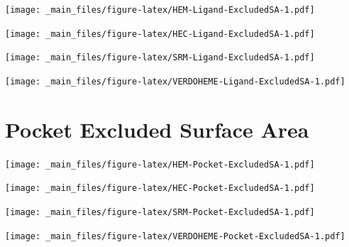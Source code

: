 \documentclass[a4paper, nobind]{templates/ociamthesis}
\let\origfigure\figure
\let\endorigfigure\endfigure
\renewenvironment{figure}[1][2] {
    \expandafter\origfigure\expandafter[H]
} {
    \endorigfigure
}
\begin{document}
\begin{figure}
\centering
\texttt{[image: \_main\_files/figure-latex/HEM-Ligand-ExcludedSA-1.pdf]}
\caption{\label{fig:HEM-Ligand-ExcludedSA}HEM: Ligand Excluded Suface Area}
\end{figure}

\begin{figure}
\centering
\texttt{[image: \_main\_files/figure-latex/HEC-Ligand-ExcludedSA-1.pdf]}
\caption{\label{fig:HEC-Ligand-ExcludedSA}HEC: Ligand Excluded Suface Area}
\end{figure}

\begin{figure}
\centering
\texttt{[image: \_main\_files/figure-latex/SRM-Ligand-ExcludedSA-1.pdf]}
\caption{\label{fig:SRM-Ligand-ExcludedSA}SRM: Ligand Excluded Suface Area}
\end{figure}

\begin{figure}
\centering
\texttt{[image: \_main\_files/figure-latex/VERDOHEME-Ligand-ExcludedSA-1.pdf]}
\caption{\label{fig:VERDOHEME-Ligand-ExcludedSA}VERDOHEME: Ligand Excluded Suface Area}
\end{figure}

\hypertarget{figs-pocketExcSA}{%
\section{Pocket Excluded Surface Area}\label{figs-pocketExcSA}}

\begin{figure}
\centering
\texttt{[image: \_main\_files/figure-latex/HEM-Pocket-ExcludedSA-1.pdf]}
\caption{\label{fig:HEM-Pocket-ExcludedSA}HEM: Pocket Excluded Surface Area}
\end{figure}

\begin{figure}
\centering
\texttt{[image: \_main\_files/figure-latex/HEC-Pocket-ExcludedSA-1.pdf]}
\caption{\label{fig:HEC-Pocket-ExcludedSA}HEC: Pocket Excluded Surface Area}
\end{figure}

\begin{figure}
\centering
\texttt{[image: \_main\_files/figure-latex/SRM-Pocket-ExcludedSA-1.pdf]}
\caption{\label{fig:SRM-Pocket-ExcludedSA}SRM: Pocket Excluded Surface Area}
\end{figure}

\begin{figure}
\centering
\texttt{[image: \_main\_files/figure-latex/VERDOHEME-Pocket-ExcludedSA-1.pdf]}
\caption{\label{fig:VERDOHEME-Pocket-ExcludedSA}VERDOHEME: Pocket Excluded Surface Area}
\end{figure}
\end{document}
